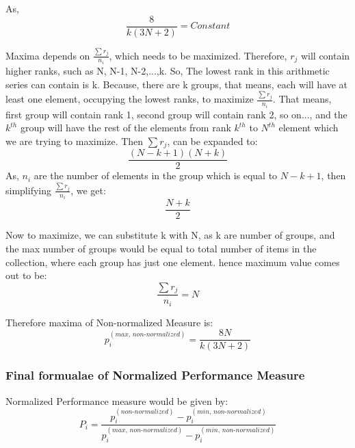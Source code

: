\documentclass[a4paper,fleqn,review]{cas-sc}
\begin{document}
As, 
\begin{equation}
	\frac{8}{k(3N + 2)} = Constant
\end{equation}

Maxima depends on $\frac{\sum r_j}{n_i}$, which needs to be maximized. Therefore, $r_j$ will contain higher ranks, such as N, N-1, N-2,...,k. So, The lowest rank in this arithmetic series can contain is k. Because, there are k groups, that means, each will have at least one element, occupying the lowest ranks, to maximize $\frac{\sum r_j}{n_i}$. That means, first group will contain rank 1, second group will contain rank 2, so on..., and the $k^{th}$ group will have the rest of the elements from rank $k^{th}$ to $N^{th}$ element which we are trying to maximize. Then $\sum r_j$, can be expanded to:
\begin{equation}
	\frac{(N-k+1)(N+k)}{2}
\end{equation}
As, $n_i$ are the number of elements in the group which is equal to $N-k+1$, then simplifying $\frac{\sum r_j}{n_i}$, we get:
\begin{equation}
	\frac{N+k}{2}
\end{equation}

Now to maximize, we can substitute k with N, as k are number of groups, and the max number of groups would be equal to total number of items in the collection, where each group has just one element.
hence maximum value comes out to be:
\begin{equation}
	\frac{\sum r_j}{n_i} = N
\end{equation}
 
Therefore maxima of Non-normalized Measure is:
\begin{equation}
	\label{eq:maxima}
	p_i^{(max, \, non\text{-}normalized)} = \frac{8N}{k(3N + 2)}
\end{equation}

\subsubsection{Final formualae of Normalized Performance Measure}
Normalized Performance measure would be given by:
\begin{equation}
	\label{eq:normalized-simpler}
	P_i = \frac{p_i^{(non\text{-}normalized)} - p_i^{(min, \, non\text{-}normalized)}}{p_i^{(max, \, non\text{-}normalized)} - p_i^{(min, \, non\text{-}normalized)}}
\end{equation}
\end{document}
